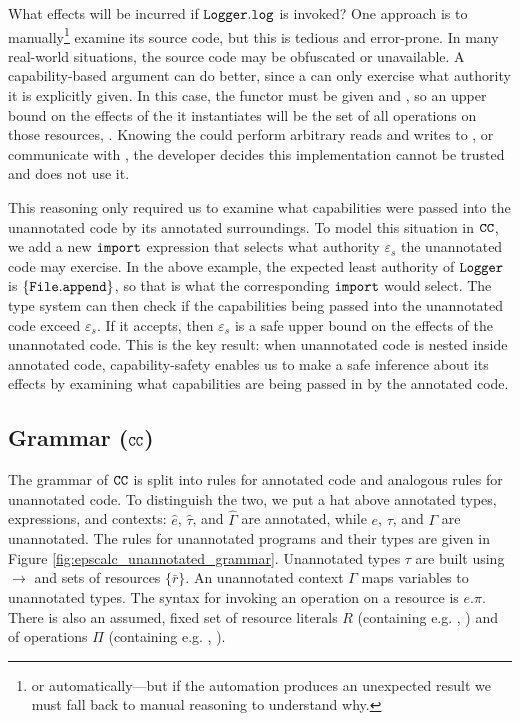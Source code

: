 What effects will be incurred if $\mathtt{Logger.log}$ is invoked? One
approach is to manually\footnote{or automatically---but if the
  automation produces an unexpected result we must fall back to manual
  reasoning to understand why.} examine its source code, but this is
tedious and error-prone. In many real-world situations, the source
code may be obfuscated or unavailable. A capability-based argument can do
better, since a  can only exercise what authority it is explicitly
given. In this case, the  functor must be given  and
, so an upper bound on the effects of the  it
instantiates will be the set of all operations on those resources,
. Knowing the  could perform
arbitrary reads and writes to , or communicate with , the developer decides this implementation cannot be trusted
and does not use it. 

This reasoning only required us to examine what capabilities were passed into
the unannotated code by its annotated surroundings. To model this situation in
$\mathtt{CC}$, we add a new $\mathtt{import}$ expression
that selects what authority $\varepsilon_s$ the unannotated code may
exercise. In the above example, the expected least authority of
$\mathtt{Logger}$ is $\{ \mathtt{File.append} \}$, so that is what the
corresponding $\mathtt{import}$ would select. The type system can then
check if the capabilities being passed into the unannotated code
exceed $\varepsilon_s$. If it accepts, then $\varepsilon_s$ is a safe
upper bound on the effects of the unannotated code. This is the
key result: when unannotated code is nested inside annotated code,
capability-safety enables us to make a safe inference about its
effects by examining what capabilities are being passed in by the
annotated code.

\vspace{-0.5cm}
\subsection{Grammar ($\mathtt{CC}$)}
\vspace{-0.2cm}

The grammar of $\mathtt{CC}$ is split into rules for annotated code and
analogous rules for unannotated code. To distinguish the two, we put a
hat above annotated types, expressions, and contexts: $\hat e$,
$\hat \tau$, and $\hat \Gamma$ are annotated, while $e$, $\tau$, and
$\Gamma$ are unannotated. The rules for unannotated programs and their
types are given in Figure
\ref{fig:epscalc_unannotated_grammar}. Unannotated types $\tau$ are
built using $\rightarrow$ and sets of resources $\{ \bar r \}$. An
unannotated context $\Gamma$ maps variables to unannotated types.
The syntax for invoking an operation on a resource is $e.\pi$. There is also
an assumed, fixed set of resource literals $R$ (containing e.g. ,
 ) and of operations $\Pi$ (containing e.g. , ).

